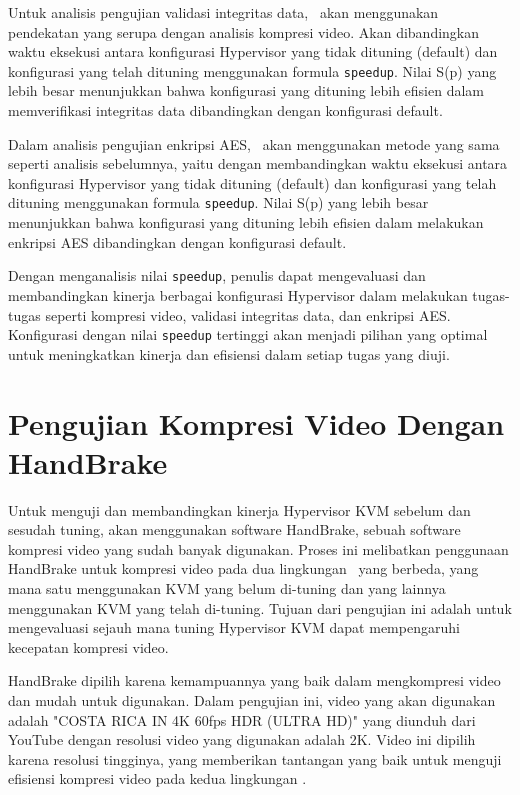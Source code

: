 Untuk analisis pengujian validasi integritas data, \saya\ akan menggunakan pendekatan yang serupa dengan analisis kompresi video. Akan dibandingkan waktu eksekusi antara konfigurasi Hypervisor yang tidak dituning (default) dan konfigurasi yang telah dituning menggunakan formula \texttt{speedup}. Nilai S(p) yang lebih besar menunjukkan bahwa konfigurasi yang dituning lebih efisien dalam memverifikasi integritas data dibandingkan dengan konfigurasi default.

Dalam analisis pengujian enkripsi AES, \saya\ akan menggunakan metode yang sama seperti analisis sebelumnya, yaitu dengan membandingkan waktu eksekusi antara konfigurasi Hypervisor yang tidak dituning (default) dan konfigurasi yang telah dituning menggunakan formula \texttt{speedup}. Nilai S(p) yang lebih besar menunjukkan bahwa konfigurasi yang dituning lebih efisien dalam melakukan enkripsi AES dibandingkan dengan konfigurasi default.

Dengan menganalisis nilai \texttt{speedup}, penulis dapat mengevaluasi dan membandingkan kinerja berbagai konfigurasi Hypervisor dalam melakukan tugas-tugas seperti kompresi video, validasi integritas data, dan enkripsi AES. Konfigurasi dengan nilai \texttt{speedup} tertinggi akan menjadi pilihan yang optimal untuk meningkatkan kinerja dan efisiensi dalam setiap tugas yang diuji.

\iffalse
    \section{Pengujian Kompresi Video Dengan HandBrake}
    Untuk menguji dan membandingkan kinerja Hypervisor KVM sebelum dan sesudah tuning, {\saya} akan menggunakan software HandBrake, sebuah software kompresi video yang sudah banyak digunakan. Proses ini melibatkan penggunaan HandBrake untuk kompresi video pada dua lingkungan \vm\ yang berbeda, yang mana satu menggunakan KVM yang belum di-tuning dan yang lainnya menggunakan KVM yang telah di-tuning. Tujuan dari pengujian ini adalah untuk mengevaluasi sejauh mana tuning Hypervisor KVM dapat mempengaruhi kecepatan kompresi video.

    HandBrake dipilih karena kemampuannya yang baik dalam mengkompresi video dan mudah untuk digunakan\cite{Folgar2014eg}. Dalam pengujian ini, video yang akan digunakan adalah "COSTA RICA IN 4K 60fps HDR (ULTRA HD)" yang diunduh dari YouTube dengan resolusi video yang digunakan adalah 2K. Video ini dipilih karena resolusi tingginya, yang memberikan tantangan yang baik untuk menguji efisiensi kompresi video pada kedua lingkungan \vm.


